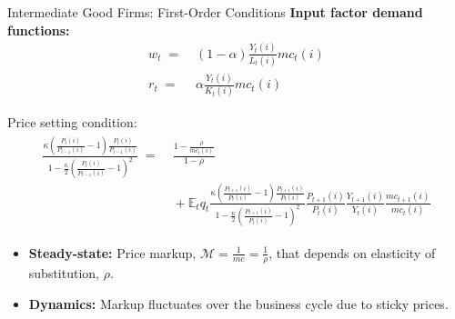 \documentclass[10pt,c,aspectratio=1610,handout]{beamer}
\begin{document}
\begin{frame}{Intermediate Good Firms: First-Order Conditions}%
  \textbf{Input factor demand functions:}%
  \begin{align}%
    w_t \; = & \; \left(1-\alpha\right) \frac{Y_t(i)}{L_t(i)} mc_t(i)\\%
    r_{t} \; = & \; \alpha \frac{Y_{t}(i)}{K_{t}(i)} mc_{t}(i)%
  \end{align}%
  \pause%
  \begin{block}{Price setting condition:}%
    \begin{align}%
      \begin{split}%
        \frac{\kappa \left(\frac{P_{t}(i)}{P_{t-1}(i)}-1\right) \frac{P_t(i)}{P_{t-1}(i)}}{1-\frac{\kappa}{2}\left(\frac{P_{t}(i)}{P_{t-1}(i)}-1\right)^2} \; = & \; \frac{1-\frac{\rho}{mc_t(i)}}{1-\rho}\\%
        & \; + \mathbb{E}_t q_t \frac{\kappa \left(\frac{P_{t+1}(i)}{P_t(i)}-1\right) \frac{P_{t+1}(i)}{P_t(i)}}{1-\frac{\kappa}{2}\left(\frac{P_{t+1}(i)}{P_t(i)}-1\right)^2} \frac{P_{t+1}(i)}{P_t(i)} \frac{Y_{t+1}(i)}{Y_t(i)} \frac{mc_{t+1}(i)}{mc_t(i)}%
      \end{split}%
    \end{align}%
    \vspace*{-0.15in}%
    \begin{small}%
      \begin{itemize}%
        \item[$\blacktriangleright$] \textbf{Steady-state:} Price markup, $\mathcal{M} = \frac{1}{mc} = \frac{1}{\rho}$, that depends on elasticity of substitution, $\rho$.%
        \item[$\blacktriangleright$] \textbf{Dynamics:} Markup fluctuates over the business cycle due to sticky prices.%
      \end{itemize}%
    \end{small}%
  \end{block}%
\end{frame}%
\end{document}
